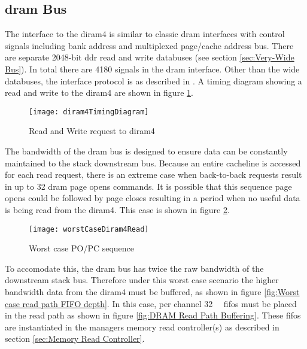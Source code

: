 \subsection{\ac{dram} Bus}
\label{sec:DRAM Bus}

The interface to the \ac{diram4} is similar to classic \ac{dram} interfaces with control signals including bank address and multiplexed page/cache address bus.
There are separate 2048-bit \ac{ddr} read and write databuses (see section \ref{sec:Very-Wide Bus}).
In total there are 4180 signals in the \ac{dram} interface.
Other than the wide databuses, the interface protocol is as described in \cite{tezzaron:diram4}.
A timing diagram showing a read and write to the \ac{diram4} are shown in figure \ref{fig:diram4Timing}.
\begin{figure}[!t]
\centering
\captionsetup{justification=centering}
\captionsetup{width=.9\linewidth}
\centerline{
\mbox{\texttt{[image: diram4TimingDiagram]}}
}
\caption{Read and Write request to \ac{diram4} \cite{tezzaron:diram4}}
\label{fig:diram4Timing}
\end{figure}



The bandwidth of the \ac{dram} bus is designed to ensure data can be constantly maintained to the stack downstream bus.
Because an entire cacheline is accessed for each read request, there is an extreme case when back-to-back requests result in up to 32 \ac{dram} page opens commands.
It is possible that this sequence page opens could be followed by page closes resulting in a period when no useful data is being read from the \ac{diram4}.
This case is shown in figure \ref{fig:Worst case PO/PC sequence}.
\begin{figure}[!t]
\centering
\captionsetup{justification=centering}
\captionsetup{width=.9\linewidth}
\centerline{
\mbox{\texttt{[image: worstCaseDiram4Read]}}
}
\caption{Worst case PO/PC sequence}
\label{fig:Worst case PO/PC sequence}
\end{figure}
To accomodate this, the \ac{dram} bus has twice the raw bandwidth of the downstream stack bus. 
Therefore under this worst case scenario the higher bandwidth data from the \ac{diram4} must be buffered, as shown in figure \ref{fig:Worst case read path FIFO depth}.
In this case, per channel \SI[per-mode=symbol]{32}{\kilo\bit} \acp{fifo} must be placed in the read path as shown in figure \ref{fig:DRAM Read Path Buffering}.
These \acp{fifo} are instantiated in the managers memory read controller(s) as described in section \ref{sec:Memory Read Controller}.


